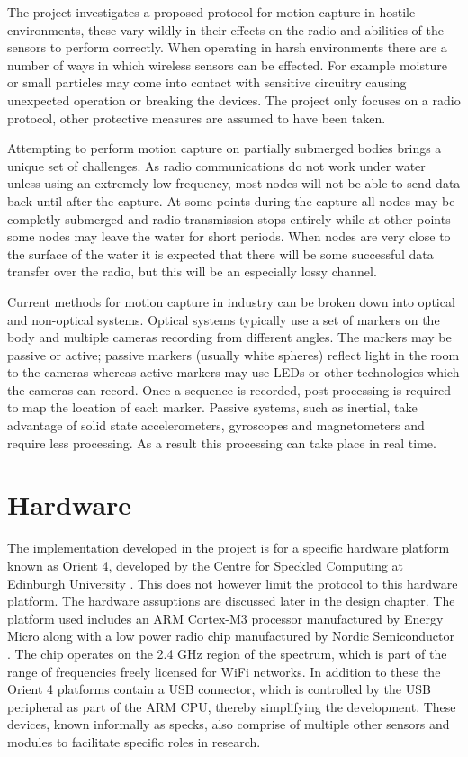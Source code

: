 \documentclass[parskip]{cs4rep}
\begin{document}
The project investigates a proposed protocol for motion capture in hostile environments, these vary wildly in their effects on the radio and abilities of the sensors to perform correctly. When operating in harsh environments there are a number of ways in which wireless sensors can be effected. For example moisture or small particles may come into contact with sensitive circuitry causing unexpected operation or breaking the devices. The project only focuses on a radio protocol, other protective measures are assumed to have been taken.

Attempting to perform motion capture on partially submerged bodies brings a unique set of challenges. As radio communications do not work under water unless using an extremely low frequency, most nodes will not be able to send data back until after the capture. At some points during the capture all nodes may be completly submerged and radio transmission stops entirely while at other points some nodes may leave the water for short periods. When nodes are very close to the surface of the water it is expected that there will be some successful data transfer over the radio, but this will be an especially lossy channel. 

Current methods for motion capture in industry can be broken down into optical and non-optical systems. Optical systems typically use a set of markers on the body and multiple cameras recording from different angles. The markers may be passive or active; passive markers (usually white spheres) reflect light in the room to the cameras whereas active markers may use LEDs or other technologies which the cameras can record. Once a sequence is recorded, post processing is required to map the location of each marker. Passive systems, such as inertial, take advantage of solid state accelerometers, gyroscopes and magnetometers and require less processing. As a result this processing can take place in real time. 

\section{Hardware}

The implementation developed in the project is for a specific hardware platform known as Orient 4, developed by the Centre for Speckled Computing at Edinburgh University \cite{W6}. This does not however limit the protocol to this hardware platform. The hardware assuptions are discussed later in the design chapter. The platform used includes an ARM Cortex-M3 processor manufactured by Energy Micro \cite{W1} along with a low power radio chip manufactured by Nordic Semiconductor \cite{W5}. The chip operates on the 2.4 GHz region of the spectrum, which is part of the range of frequencies freely licensed for WiFi networks. In addition to these the Orient 4 platforms contain a USB connector, which is controlled by the USB peripheral as part of the ARM CPU, thereby simplifying the development. These devices, known informally as specks, also comprise of multiple other sensors and modules to facilitate specific roles in research.
\end{document}
